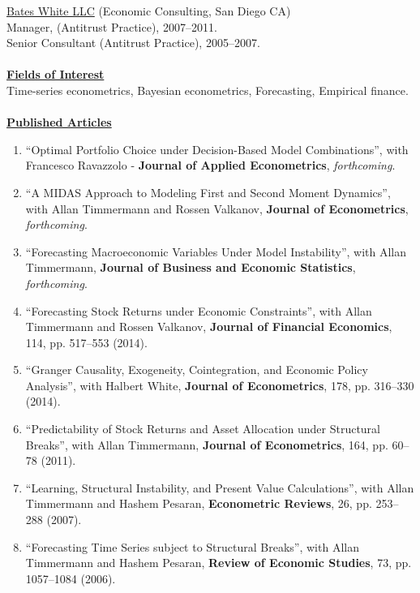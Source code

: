 \documentclass[12pt]{article}
\begin{document}
\underline{Bates White LLC} (Economic Consulting, San Diego CA)\\
Manager, (Antitrust Practice), 2007--2011.\\
Senior Consultant (Antitrust Practice), 2005--2007. \\ \\
\underline{\textbf{Fields of Interest}}\\
Time-series econometrics, Bayesian econometrics, Forecasting, Empirical finance.\\ \\
\underline{\textbf{Published Articles}}
\begin{enumerate}	

	\item ``Optimal Portfolio Choice under Decision-Based Model Combinations'', with Francesco Ravazzolo - \textbf{Journal of Applied Econometrics}, \textit{forthcoming}.
	\item ``A MIDAS Approach to Modeling First and Second Moment Dynamics'', with Allan Timmermann and Rossen Valkanov, \textbf{Journal of Econometrics}, \textit{forthcoming}.
  \item ``Forecasting Macroeconomic Variables Under Model Instability'', with Allan Timmermann, \textbf{Journal of Business and Economic Statistics},  \textit{forthcoming}. 
	\item ``Forecasting Stock Returns under Economic Constraints'', with Allan Timmermann and Rossen Valkanov, \textbf{Journal of Financial Economics}, 114, pp. 517--553 (2014). 
	\item ``Granger Causality, Exogeneity, Cointegration, and Economic Policy Analysis'', with Halbert White, \textbf{Journal of Econometrics}, 178, pp. 316--330 (2014). 
	\item ``Predictability of Stock Returns and Asset Allocation under Structural Breaks'', with Allan Timmermann, \textbf{Journal of Econometrics}, 164, pp. 60--78 (2011). 
	\item ``Learning, Structural Instability, and Present Value Calculations'', with Allan Timmermann and Hashem Pesaran, \textbf{Econometric Reviews}, 26, pp. 253--288 (2007). 
	\item ``Forecasting Time Series subject to Structural Breaks'', with Allan Timmermann and Hashem Pesaran, \textbf{Review of Economic Studies}, 73, pp. 1057--1084 (2006). 

    \setcounter{enumTemp}{\theenumi}
 \end{enumerate}
\end{document}
